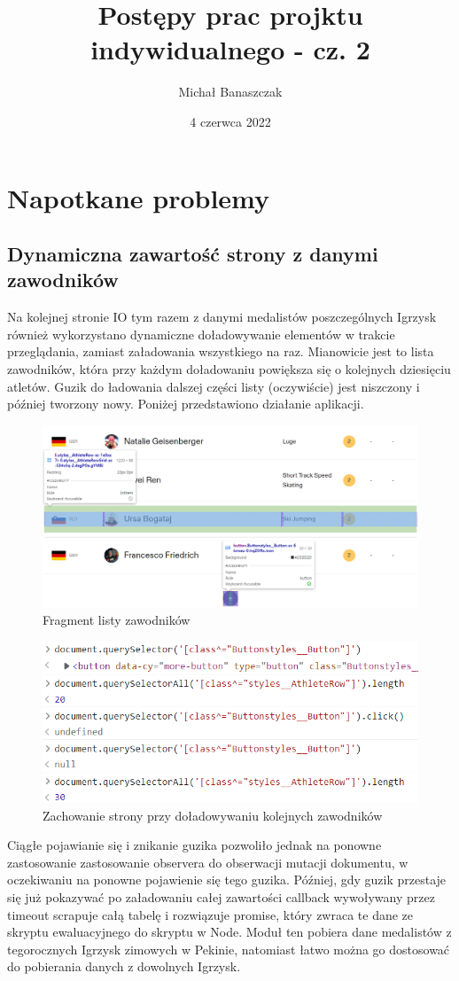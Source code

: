 \documentclass[a4paper,11pt]{article}
\title{Postępy prac projktu indywidualnego - cz. 2}
\author{Michał Banaszczak}
\date{4 czerwca 2022}
\begin{document}
\maketitle

\section{Napotkane problemy}

\subsection{Dynamiczna zawartość strony z danymi zawodników}
Na kolejnej stronie IO tym razem z danymi medalistów poszczególnych Igrzysk
również wykorzystano dynamiczne doładowywanie elementów w trakcie przeglądania,
zamiast załadowania wszystkiego na raz. Mianowicie jest to lista zawodników, która
przy każdym doładowaniu powiększa się o kolejnych dziesięciu atletów. Guzik do
ładowania dalszej części listy (oczywiście) jest niszczony i później tworzony nowy.
Poniżej przedstawiono działanie aplikacji.
\begin{figure}[h!t]
    \centering
    \includegraphics[width=\linewidth]{fragmentlisty.png}
    \caption{Fragment listy zawodników}
\end{figure}
\begin{figure}[h!t]
    \centering
    \includegraphics[width=0.65\linewidth]{zachowanielisty.png}
    \caption{Zachowanie strony przy doładowywaniu kolejnych zawodników}
\end{figure}
\newline
Ciągłe pojawianie się i znikanie guzika pozwoliło jednak na ponowne zastosowanie 
zastosowanie observera do obserwacji mutacji dokumentu, w oczekiwaniu na ponowne
pojawienie się tego guzika. Później, gdy guzik przestaje się już pokazywać po
załadowaniu całej zawartości callback wywoływany przez timeout scrapuje całą 
tabelę i rozwiązuje promise, który zwraca te dane ze skryptu ewaluacyjnego do
skryptu w Node. Moduł ten pobiera dane medalistów z tegorocznych Igrzysk zimowych
w Pekinie, natomiast łatwo można go dostosować do pobierania danych z dowolnych
Igrzysk. 
\end{document}
